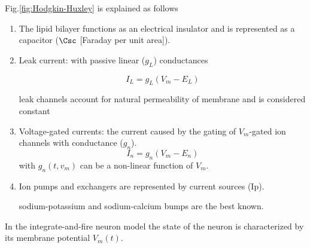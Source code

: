 Fig.\ref{fig:Hodgkin-Huxley} is explained as follows
\begin{enumerate}
  \item The lipid bilayer functions as an electrical insulator and is
  represented as a capacitor ($\Csc$ [Faraday per unit area]). 

  \item Leak current: with passive linear ($g_L$) conductances
  
\begin{equation}
I_L = g_L (V_m - E_L)
\end{equation}
  
  leak channels account for natural permeability of membrane and
  is considered constant
  
  \item Voltage-gated currents: the current caused by the gating of $V_m$-gated
  ion channels with conductance ($g_n$).
\begin{equation}
I_n = g_n (V_m - E_n)
\end{equation}
with $g_n(t,v_m)$ can be a non-linear function of $V_m$.

  
  \item Ion pumps and exchangers are represented by current sources (Ip).

 sodium-potassium and sodium-calcium bumps are the best known.
  
\end{enumerate}

In the integrate-and-fire neuron model the state of the neuron is characterized
by its membrane potential $V_m(t)$. 

